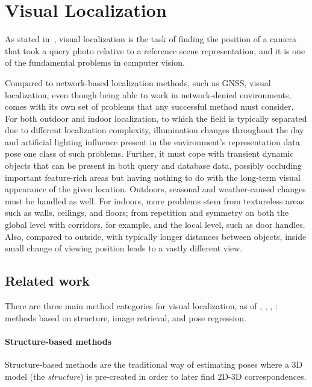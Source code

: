 \chapter{Visual Localization}

As stated in~, visual localization is the task of finding
the position of a camera that took a query photo relative to a reference scene
representation, and it is one of the fundamental problems in computer vision.

Compared to network-based localization methods, such as GNSS, visual localization,
even though being able to work in network-denied environments, comes with its own
set of problems that any successful method must consider. For both outdoor and
indoor localization, to which the field is typically separated due to different
localization complexity, illumination changes throughout the day and artificial lighting
influence present in the environment's representation data pose one class of such problems.
Further, it must cope with transient dynamic objects that can be present in both query
and database data, possibly occluding important feature-rich areas but having nothing
to do with the long-term visual appearance of the given location. Outdoors, seasonal and
weather-caused changes must be handled as well. For indoors, more problems stem from
textureless areas such as walls, ceilings, and floors; from repetition and symmetry
on both the global level with corridors, for example, and the local level, such as door handles.
Also, compared to outside, with typically longer distances between objects, inside small change
of viewing position leads to a vastly different view.

\section{Related work}

There are three main method categories for visual localization, as of \citet{torsten2018},
\citet{torsten2019}, \citet{torsten2021}, \citet{naverlabs}: methods based on structure,
image retrieval, and pose regression.

\subsubsection*{Structure-based methods}

Structure-based methods are the traditional way of estimating poses where a 3D model (the \emph{structure}) is
pre-created in order to later find 2D-3D correspondences.

